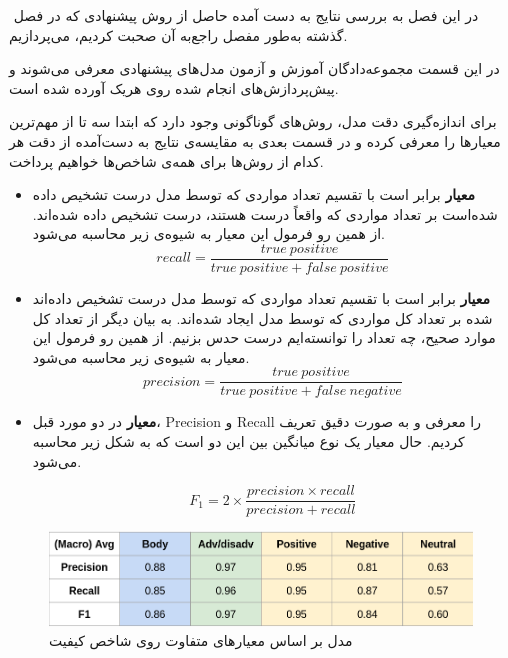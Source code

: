 
\label{sec:results}
‌
در این فصل به بررسی نتایج به دست آمده حاصل از روش پیشنهادی که در فصل گذشته به‌طور مفصل راجع‌به آن صحبت کردیم، می‌پردازیم.


در این قسمت مجموعه‌دادگان آموزش و آزمون مدل‌های پیشنهادی معرفی می‌شوند و پیش‌پردازش‌های انجام شده روی هریک آورده شده است.


برای اندازه‌گیری دقت مدل، روش‌های گوناگونی وجود دارد که ابتدا سه تا از مهم‌ترین معیارها را معرفی کرده و در قسمت بعدی به مقایسه‌ی نتایج به دست‌آمده از دقت هر کدام از روش‌ها برای همه‌ی شاخص‌ها خواهیم پرداخت.

\begin{itemize}
    \item \textbf{معیار }
    برابر است با تقسیم تعداد مواردی که توسط مدل درست تشخیص داده شده‌است بر تعداد مواردی که واقعاً درست هستند، درست تشخیص داده شده‌اند.
    از همین رو فرمول این معیار به شیوه‌ی زیر محاسبه می‌شود.
        \begin{equation}
            recall = \dfrac{true \: positive}{true \: positive + false \: positive}
        \end{equation}
    \item \textbf{معیار }
    برابر است با تقسیم تعداد مواردی که توسط مدل درست تشخیص داده‌اند شده بر تعداد کل مواردی که توسط مدل ایجاد شده‌اند. به بیان دیگر از تعداد کل موارد صحیح، چه تعداد را توانسته‌ایم درست حدس بزنیم. از همین رو فرمول این معیار به شیوه‌ی زیر محاسبه می‌شود.
        \begin{equation}
            precision = \dfrac{true \: positive}{true \: positive + false \: negative}
        \end{equation}
    \item \textbf{معیار }
     در دو مورد قبل، Precision و Recall را معرفی و به صورت دقیق تعریف کردیم. حال معیار 
     یک نوع میانگین بین این دو است که به شکل زیر محاسبه می‌شود.
     
        \begin{equation}
            F_1 = 2 \times \dfrac{precision \times recall}{precision + recall}
        \end{equation}
\end{itemize}


\begin{figure}[H]
\centering
\includegraphics[width=15cm]{figs/quality.png}
\caption{ ‌مدل بر اساس معیارهای متفاوت روی شاخص کیفیت}\label{}
\label{fig:test}
\end{figure}


